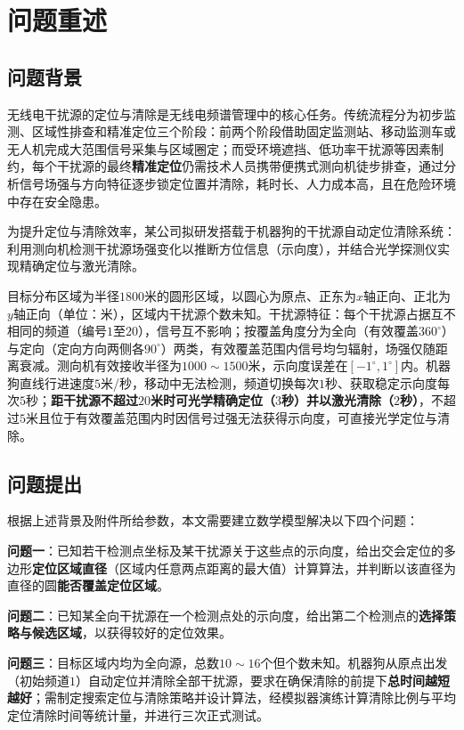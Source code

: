 \documentclass[withoutpreface]{cumcmthesis}
\begin{document}
\section{问题重述}

\subsection{问题背景}

无线电干扰源的定位与清除是无线电频谱管理中的核心任务。传统流程分为初步监测、区域性排查和精准定位三个阶段：前两个阶段借助固定监测站、移动监测车或无人机完成大范围信号采集与区域圈定；而受环境遮挡、低功率干扰源等因素制约，每个干扰源的最终\textbf{精准定位}仍需技术人员携带便携式测向机徒步排查，通过分析信号场强与方向特征逐步锁定位置并清除，耗时长、人力成本高，且在危险环境中存在安全隐患。

为提升定位与清除效率，某公司拟研发搭载于机器狗的干扰源自动定位清除系统：利用测向机检测干扰源场强变化以推断方位信息（示向度），并结合光学探测仪实现精确定位与激光清除。

目标分布区域为半径$1800$米的圆形区域，以圆心为原点、正东为$x$轴正向、正北为$y$轴正向（单位：米），区域内干扰源个数未知。干扰源特征：每个干扰源占据互不相同的频道（编号$1$至$20$），信号互不影响；按覆盖角度分为全向（有效覆盖$360^\circ$）与定向（定向方向两侧各$90^\circ$）两类，有效覆盖范围内信号均匀辐射，场强仅随距离衰减。测向机有效接收半径为$1000\sim1500$米，示向度误差在$[-1^\circ,1^\circ]$内。机器狗直线行进速度$5$米/秒，移动中无法检测，频道切换每次$1$秒、获取稳定示向度每次$5$秒；\textbf{距干扰源不超过$20$米时可光学精确定位（$3$秒）并以激光清除（$2$秒）}，不超过$5$米且位于有效覆盖范围内时因信号过强无法获得示向度，可直接光学定位与清除。

\subsection{问题提出}

根据上述背景及附件所给参数，本文需要建立数学模型解决以下四个问题：

\textbf{问题一}：已知若干检测点坐标及某干扰源关于这些点的示向度，给出交会定位的多边形\textbf{定位区域直径}（区域内任意两点距离的最大值）计算算法，并判断以该直径为直径的圆\textbf{能否覆盖定位区域}。

\textbf{问题二}：已知某全向干扰源在一个检测点处的示向度，给出第二个检测点的\textbf{选择策略与候选区域}，以获得较好的定位效果。

\textbf{问题三}：目标区域内均为全向源，总数$10\sim16$个但个数未知。机器狗从原点出发（初始频道$1$）自动定位并清除全部干扰源，要求在确保清除的前提下\textbf{总时间越短越好}；需制定搜索定位与清除策略并设计算法，经模拟器演练计算清除比例与平均定位清除时间等统计量，并进行三次正式测试。
\end{document}
